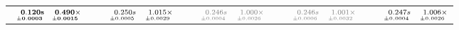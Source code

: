 \documentclass[a4paper,UKenglish]{lipics-v2016}
\begin{document}
\begin{table*}
\begin{adjustbox}{width=1.2\textwidth,center}
\begin{tabular}{rrrp{.1em}rrrp{.1em}rrrp{.1em}rrrp{.1em}rrr}
\cellcolor{black!5}{\tiny \textbf{p$_{2}$}:}&\cellcolor{black!5}$\substack{\mathmakebox[.7cm][r]{\mathbf{0.120}}\mathbf{s}\\{\mathmakebox[.7cm][r]{\scriptscriptstyle \mathbf{\pm 0.0003}}}}$&\cellcolor{black!5}$\substack{\mathmakebox[.7cm][r]{\mathbf{0.490}}\mathbf{\times}\\{\mathmakebox[.7cm][r]{\scriptscriptstyle \mathbf{\pm 0.0015}}}}$&&\cellcolor{black!5}{\tiny p$_{18}$:}&\cellcolor{black!5}$\substack{\mathmakebox[.7cm][r]{0.250}s\\{\mathmakebox[.7cm][r]{\scriptscriptstyle \pm 0.0005}}}$&\cellcolor{black!5}$\substack{\mathmakebox[.7cm][r]{1.015}\times\\{\mathmakebox[.7cm][r]{\scriptscriptstyle \pm 0.0029}}}$&&\cellcolor{black!5}{\tiny \color{gray}{p$_{34}$}:}&\cellcolor{black!5}$\substack{\mathmakebox[.7cm][r]{\color{gray}{0.246}}\color{gray}{s}\\{\mathmakebox[.7cm][r]{\scriptscriptstyle \color{gray}{\pm 0.0004}}}}$&\cellcolor{black!5}$\substack{\mathmakebox[.7cm][r]{\color{gray}{1.000}}\color{gray}{\times}\\{\mathmakebox[.7cm][r]{\scriptscriptstyle \color{gray}{\pm 0.0026}}}}$&&\cellcolor{black!5}{\tiny \color{gray}{p$_{50}$}:}&\cellcolor{black!5}$\substack{\mathmakebox[.7cm][r]{\color{gray}{0.246}}\color{gray}{s}\\{\mathmakebox[.7cm][r]{\scriptscriptstyle \color{gray}{\pm 0.0006}}}}$&\cellcolor{black!5}$\substack{\mathmakebox[.7cm][r]{\color{gray}{1.001}}\color{gray}{\times}\\{\mathmakebox[.7cm][r]{\scriptscriptstyle \color{gray}{\pm 0.0032}}}}$&&\cellcolor{black!5}{\tiny p$_{66}$:}&\cellcolor{black!5}$\substack{\mathmakebox[.7cm][r]{0.247}s\\{\mathmakebox[.7cm][r]{\scriptscriptstyle \pm 0.0004}}}$&\cellcolor{black!5}$\substack{\mathmakebox[.7cm][r]{1.006}\times\\{\mathmakebox[.7cm][r]{\scriptscriptstyle \pm 0.0026}}}$\\

\end{tabular}
\end{adjustbox}
\end{table*}
\end{document}
